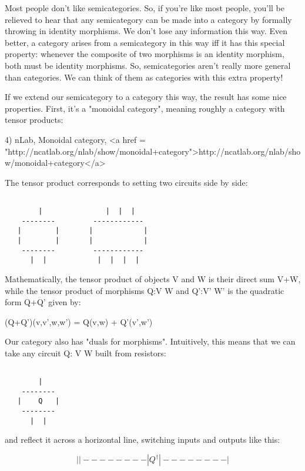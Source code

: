 Most people don't like semicategories.  So, if you're like most
people, you'll be relieved to hear that any semicategory can be made
into a category by formally throwing in identity morphisms.  We don't
lose any information this way.  Even better, a category arises from a
semicategory in this way iff it has this special property: whenever the
composite of two morphisms is an identity morphism, both must be
identity morphisms.  So, semicategories aren't really more general
than categories.  We can think of them as categories with this extra
property!

If we extend our semicategory to a category this way, the result has
some nice properties.  First, it's a "monoidal category", meaning 
roughly a category with tensor products:

4) nLab, Monoidal category, <a href = "http://ncatlab.org/nlab/show/monoidal+category">http://ncatlab.org/nlab/show/monoidal+category</a>

The tensor product corresponds to setting two circuits side by side:


\begin{verbatim}

        |               |  |  |
    --------         ------------   
   |        |       |            |
   |        |       |            |
    --------         ------------
      |  |            |  |  |  |
\end{verbatim}
    

Mathematically, the tensor product of objects V and W is their direct
sum V+W, while the tensor product of morphisms Q:V \to  W and Q':V'
\to  W' is the quadratic form Q+Q' given by:

(Q+Q')(v,v',w,w') = Q(v,w) + Q'(v',w')

Our category also has "duals for morphisms".  Intuitively, this means
that we can take any circuit Q: V \to  W built from resistors:


\begin{verbatim}

        |             
    --------        
   |    Q   |       
    --------        
      |  |          
\end{verbatim}
    
and reflect it across a horizontal line, switching inputs and outputs
like this:


$$

      |  |          
    --------        
   |   Q^{\dagger }   |       
    --------        
        |             
$$
    

